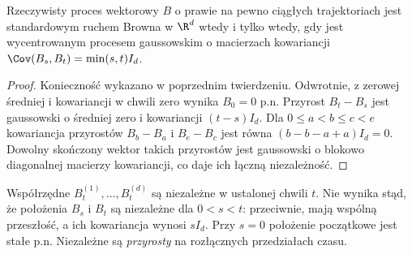 \begin{stwierdzenie}
Rzeczywisty proces wektorowy $B$ o prawie na pewno ciągłych
trajektoriach jest standardowym ruchem Browna w $\R^d$
wtedy i tylko wtedy, gdy jest wycentrowanym procesem
gaussowskim o macierzach kowariancji
$\Cov(B_s,B_t)=\min(s,t)I_d$.
\end{stwierdzenie}
\begin{proof}
Konieczność wykazano w poprzednim twierdzeniu.
Odwrotnie, z zerowej średniej i kowariancji w chwili zero
wynika $B_0=0$ p.n. Przyrost $B_t-B_s$ jest gaussowski
o średniej zero i kowariancji $(t-s)I_d$.
Dla $0\le a<b\le c<e$ kowariancja przyrostów
$B_b-B_a$ i $B_e-B_c$ jest równa
$(b-b-a+a)I_d=0$. Dowolny skończony wektor takich
przyrostów jest gaussowski o blokowo diagonalnej
macierzy kowariancji, co daje ich łączną niezależność.
\end{proof}

\begin{uwaga}
Współrzędne $B_t^{(1)},\ldots,B_t^{(d)}$ są niezależne w ustalonej
chwili $t$. Nie wynika stąd, że położenia $B_s$ i $B_t$ są niezależne
dla $0<s<t$: przeciwnie, mają wspólną przeszłość, a ich kowariancja
wynosi $sI_d$. Przy $s=0$ położenie początkowe jest stałe p.n. Niezależne są \emph{przyrosty} na rozłącznych
przedziałach czasu.
\end{uwaga}

